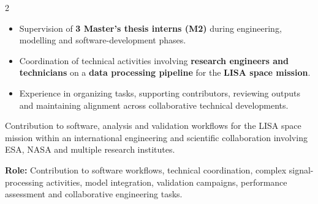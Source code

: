 \documentclass[8pt,a4paper,ragged2e,withhyper]{altacv}
\begin{document}
\begin{paracol}{2}

\begin{itemize}
  \item Supervision of \textbf{3 Master's thesis interns (M2)} during engineering, modelling and software-development phases.
  \item Coordination of technical activities involving \textbf{research engineers and technicians} on a \textbf{data processing pipeline} for the \textbf{LISA space mission}.
  \item Experience in organizing tasks, supporting contributors, reviewing outputs and maintaining alignment across collaborative technical developments.
\end{itemize}


\divider

\divider

\medskip


\divider

\divider

\divider




\end{paracol}



Contribution to software, analysis and validation workflows for the LISA space mission within an international engineering and scientific collaboration involving ESA, NASA and multiple research institutes.

\textbf{Role:} Contribution to software workflows, technical coordination, complex signal-processing activities, model integration, validation campaigns, performance assessment and collaborative engineering tasks.
\end{document}
